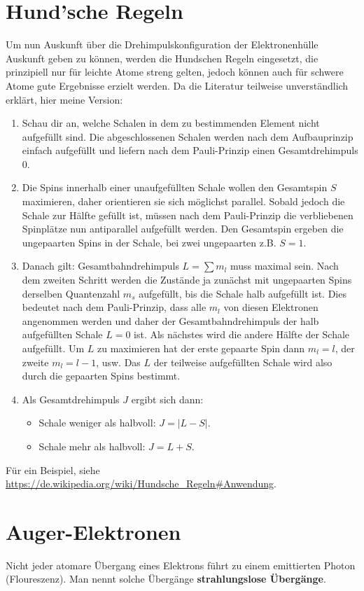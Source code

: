 \section{Hund'sche Regeln}
Um nun Auskunft über die Drehimpulskonfiguration der Elektronenhülle Auskunft geben zu können, werden die Hundschen Regeln eingesetzt, die prinzipiell nur für leichte Atome streng gelten, jedoch können auch für schwere Atome gute Ergebnisse erzielt werden.
Da die Literatur teilweise unverständlich erklärt, hier meine Version:
\begin{enumerate}
	\item Schau dir an, welche Schalen in dem zu bestimmenden Element nicht aufgefüllt sind.
	Die abgeschlossenen Schalen werden nach dem Aufbauprinzip einfach aufgefüllt und liefern nach dem Pauli-Prinzip einen Gesamtdrehimpuls 0.
	\item Die Spins innerhalb einer unaufgefüllten Schale wollen den Gesamtspin $S$ maximieren, daher orientieren sie sich möglichst parallel.
	Sobald jedoch die Schale zur Hälfte gefüllt ist, müssen nach dem Pauli-Prinzip die verbliebenen Spinplätze nun antiparallel aufgefüllt werden.
	Den Gesamtspin ergeben die ungepaarten Spins in der Schale, bei zwei ungepaarten z.B. $S=1$.
	\item Danach gilt: Gesamtbahndrehimpuls $L=\sum m_l$ muss maximal sein.
	Nach dem zweiten Schritt werden die Zustände ja zunächst mit ungepaarten Spins derselben Quantenzahl $m_s$ aufgefüllt, bis die Schale halb aufgefüllt ist.
	Dies bedeutet nach dem Pauli-Prinzip, dass alle $m_l$ von diesen Elektronen angenommen werden und daher der Gesamtbahndrehimpuls der halb aufgefüllten Schale $L=0$ ist.
	Als nächstes wird die andere Hälfte der Schale aufgefüllt. Um $L$ zu maximieren hat der erste gepaarte Spin dann $m_l=l$, der zweite $m_l=l-1$, usw.
	Das $L$ der teilweise aufgefüllten Schale wird also durch die gepaarten Spins bestimmt.
	\item Als Gesamtdrehimpuls $J$ ergibt sich dann:
	\begin{itemize}
		\item Schale weniger als halbvoll: $J=|L-S|$.
		\item Schale mehr als halbvoll: $J=L+S$.
	\end{itemize}
\end{enumerate}
Für ein Beispiel, siehe \url{https://de.wikipedia.org/wiki/Hundsche_Regeln#Anwendung}.

\section{Auger-Elektronen}
Nicht jeder atomare Übergang eines Elektrons führt zu einem emittierten Photon (Floureszenz).
Man nennt solche Übergänge \textbf{strahlungslose Übergänge}.

